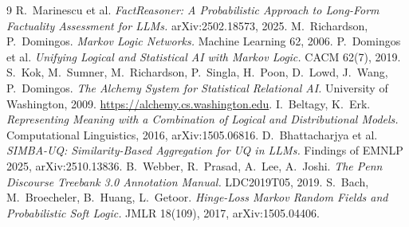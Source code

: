 \documentclass[11pt]{article}
\begin{document}
\begin{thebibliography}{9}\small
{} R.~Marinescu et al.
  \emph{FactReasoner: A Probabilistic Approach to Long-Form Factuality Assessment for LLMs.}
  arXiv:2502.18573, 2025.
 M.~Richardson, P.~Domingos. \emph{Markov Logic Networks.}
  Machine Learning 62, 2006.
 P.~Domingos et al.
  \emph{Unifying Logical and Statistical AI with Markov Logic.} CACM 62(7), 2019.
 S.~Kok, M.~Sumner, M.~Richardson, P.~Singla, H.~Poon, D.~Lowd,
  J.~Wang, P.~Domingos. \emph{The Alchemy System for Statistical Relational AI.}
  University of Washington, 2009. \url{https://alchemy.cs.washington.edu}.
 I.~Beltagy, K.~Erk.
  \emph{Representing Meaning with a Combination of Logical and Distributional Models.}
  Computational Linguistics, 2016, arXiv:1505.06816.
 D.~Bhattacharjya et al.
  \emph{SIMBA-UQ: Similarity-Based Aggregation for UQ in LLMs.} Findings of EMNLP 2025,
  arXiv:2510.13836.
 B.~Webber, R.~Prasad, A.~Lee, A.~Joshi.
  \emph{The Penn Discourse Treebank 3.0 Annotation Manual.} LDC2019T05, 2019.
 S.~Bach, M.~Broecheler, B.~Huang, L.~Getoor.
  \emph{Hinge-Loss Markov Random Fields and Probabilistic Soft Logic.} JMLR 18(109), 2017,
  arXiv:1505.04406.
\end{thebibliography}
\end{document}
